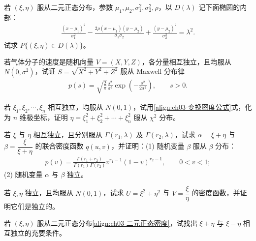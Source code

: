 \documentclass[../../main.tex]{subfiles}
\begin{document}
\begin{exercise}\label{exercise:ch03-35}
若 $(\xi,\eta)$ 服从二元正态分布，参数 $\mu_1,\mu_2,\sigma_1^{2},\sigma_2^{2},\rho$，以 $D(\lambda)$ 记下面椭圆的内部：
\begin{align*}\frac{(x-\mu_1)^{2}}{\sigma_1^{2}}-\frac{2\rho(x-\mu_1)(y-\mu_2)}{\sigma_1\sigma_2}+\frac{(y-\mu_2)^{2}}{\sigma_2^{2}}=\lambda^{2}.\end{align*}
试求 $P\{(\xi,\eta)\in D(\lambda)\}$。
\end{exercise}

\begin{exercise}\label{exercise:ch03-36}
若气体分子的速度是随机向量 $V=(X,Y,Z)$，各分量相互独立，且均服从 $N(0,\sigma^{2})$，试证 $S=\sqrt{X^{2}+Y^{2}+Z^{2}}$ 服从 Maxwell 分布律
\begin{align*}p(s)=\sqrt{\frac{2}{\pi}}\frac{s^{2}}{\sigma^{3}}\exp\left(-\frac{s^{2}}{2\sigma^{2}}\right),\qquad s>0.\end{align*}
\end{exercise}

\begin{exercise}\label{exercise:ch03-37}
若 $\xi_1,\xi_2,\cdots,\xi_n$ 相互独立，均服从 $N(0,1)$，试用\eqref{align:ch03-变换密度公式}式，化为 $n$ 维极坐标，证明 $\eta=\xi_1^{2}+\xi_2^{2}+\cdots+\xi_n^{2}$ 服从 $\chi^{2}$ 分布。
\end{exercise}

\begin{exercise}\label{exercise:ch03-38}
若 $\xi$ 与 $\eta$ 相互独立，且分别服从 $\Gamma(r_1,\lambda)$ 及 $\Gamma(r_2,\lambda)$，试求 $\alpha=\xi+\eta$ 与 $\beta=\dfrac{\xi}{\xi+\eta}$ 的联合密度函数 $q(u,v)$，并证明：(1) 随机变量 $\beta$ 服从 $\beta$ 分布：
\begin{align*}p(v)=\frac{\Gamma(r_1+r_2)}{\Gamma(r_1)\,\Gamma(r_2)}v^{r_1-1}(1-v)^{r_2-1},\qquad 0<v<1;\end{align*}
(2) 随机变量 $\alpha$ 与 $\beta$ 独立。
\end{exercise}

\begin{exercise}\label{exercise:ch03-39}
若 $\xi,\eta$ 独立，且均服从 $N(0,1)$，试求 $U=\xi^{2}+\eta^{2}$ 与 $V=\dfrac{\xi}{\eta}$ 的密度函数，并证明它们是独立的。
\end{exercise}

\begin{exercise}\label{exercise:ch03-40}
若 $(\xi,\eta)$ 服从二元正态分布\eqref{align:ch03-二元正态密度}，试找出 $\xi+\eta$ 与 $\xi-\eta$ 相互独立的充要条件。
\end{exercise}
\end{document}

